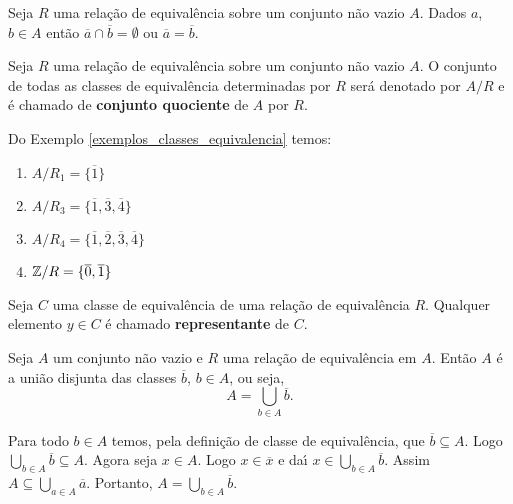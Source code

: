 \begin{corolario}
	Seja $R$ uma rela\c{c}\~ao de equival\^encia sobre um conjunto n\~ao vazio $A$. Dados $a$, $b \in A$ ent\~ao $\overline{a} \cap \overline{b} = \emptyset$ ou $\overline{a} = \overline{b}$.
\end{corolario}

\begin{definicao}
	Seja $R$ uma rela\c{c}\~ao de equival\^encia sobre um conjunto n\~ao vazio $A$. O conjunto de todas as classes de equival{\^e}ncia determinadas por $R$ ser{\'a} denotado por $A/R$ e {\'e} chamado de \textbf{conjunto quociente} de $A$ por $R$.
\end{definicao}

\begin{exemplos}
	Do Exemplo \ref{exemplos_classes_equivalencia} temos:
	\begin{enumerate}[label={\arabic*})]
		\item $A/R_1 = \{\overline{1}\}$
		\item $A/R_3 = \{\overline{1},\overline{3},\overline{4}\}$
		\item $A/R_4 = \{\overline{1},\overline{2},\overline{3},\overline{4}\}$
		\item $\mathbb{Z}/R = \{\overline{0},\overline{1}\}$
	\end{enumerate}
\end{exemplos}

\begin{definicao}
	Seja $C$ uma classe de equival{\^e}ncia de uma rela{\c c}{\~a}o de equival{\^e}ncia $R$. Qualquer elemento $y\in C$ {\'e} chamado \textbf{representante} de $C$.
\end{definicao}

\begin{proposicao}
	Seja $A$ um conjunto n{\~a}o vazio e $R$ uma rela{\c c}{\~a}o de equival{\^e}ncia em $A$. Ent{\~a}o $A$ {\'e} a uni{\~a}o disjunta das classes $\overline{b}$, $b \in A$, ou seja,
	\[
		A = \bigcup_{b\in A}\overline{b}.
	\]
\end{proposicao}
\begin{prova}
	Para todo $b\in A$ temos, pela defini\c{c}\~ao de classe de equival\^encia, que $\overline{b}\subseteq A$. Logo $\bigcup_{b\in A}\overline{b}\subseteq A$. Agora seja $x\in A$. Logo $x \in \overline{x}$ e da{\'\i} $x\in \bigcup_{b\in A}\overline{b}$. Assim $A\subseteq\bigcup_{a\in A}\overline{a}$. Portanto, $A=\bigcup_{b\in A}\overline{b}$.
\end{prova}

